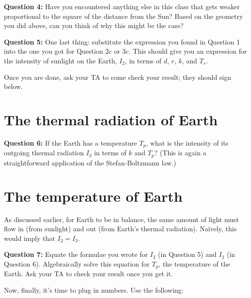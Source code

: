 \documentclass[11pt]{article}
\begin{document}
{\bf Question 4:} Have you encountered anything else in this class that gets weaker proportional to the square of the distance from the Sun? Based on the geometry you did above, can you
think of why this might be the case?

\vspace*{4cm}

\hrulefill

{\bf Question 5:} One last thing: substitute the expression you found in Question 1 into the one you got for Question 2c or 3c. This should give you an expression for the intensity of
sunlight on the Earth, $I_2$, in terms of $d$, $r$, $k$, and $T_s$.

\vspace*{3cm}

\hrulefill

Once you are done, ask your TA to come check your result; they should sign below.

\newpage


\section*{The thermal radiation of Earth}

{\bf Question 6:} If the Earth has a temperature $T_p$, what is the intensity of its outgoing thermal radiation $I_3$ in terms of $k$ and $T_p$? (This is again a straightforward application of the Stefan-Boltzmann law.)

\vspace*{3cm}

\hrulefill


\section*{The temperature of Earth}

As discussed earlier, for Earth to be in balance, the same amount of light must flow in (from sunlight) and out (from Earth's thermal radiation). Na\"{i}vely, this would imply that
$I_2=I_3$. 

{\bf Question 7:} Equate the formulae you wrote for $I_2$ (in Question 5) and $I_3$ (in Question 6). Algebraically solve this equation for $T_p$, the temperature of the Earth. Ask your 
TA to check your result once you get it.

\vspace*{5cm}

\hrulefill

Now, finally, it's time to plug in numbers. Use the following:
\end{document}
